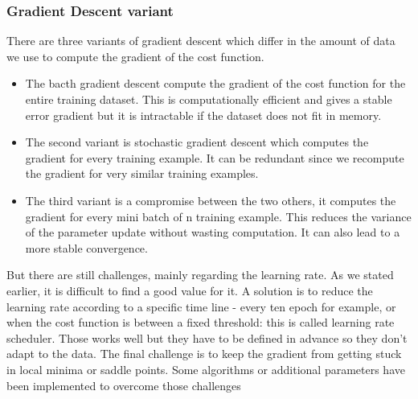 \subsubsection{Gradient Descent variant}
There are three variants of gradient descent which differ in the amount of data we use to compute the gradient of the cost function. 
\begin{itemize}
    \item The bacth gradient descent compute the gradient of the cost function for the entire training dataset. This is computationally efficient and gives a stable error gradient but it is intractable if the dataset does not fit in memory. 
    \item The second variant is stochastic gradient descent which computes the gradient for every training example. It can be redundant since we recompute the gradient for very similar training examples.
    \item The third variant is a compromise between the two others, it computes the gradient for every mini batch of n training example. This reduces the variance of the parameter update without wasting computation. It can also lead to a more stable convergence.
\end{itemize} But there are still challenges, mainly regarding the learning rate. As we stated earlier, it is difficult to find a good value for it. A solution is to reduce the learning rate according to a specific time line - every ten epoch for example, or when the cost function is between a fixed threshold: this is called learning rate scheduler. Those works well but they have to be defined in advance so they don't adapt to the data. The final challenge is to keep the gradient from getting stuck in local minima or saddle points. Some algorithms or additional parameters have been implemented to overcome those challenges
